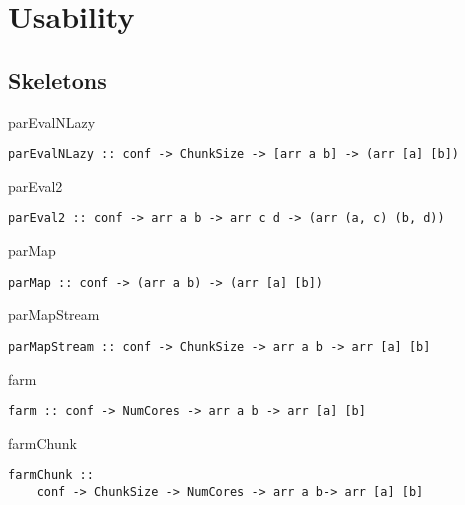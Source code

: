\section{Usability}
\subsection{Skeletons}
\begin{frame}[fragile]{parEvalNLazy}
\begin{lstlisting}[frame=htrbl]
parEvalNLazy :: conf -> ChunkSize -> [arr a b] -> (arr [a] [b])
\end{lstlisting}
\end{frame}

\begin{frame}[fragile]{parEval2}
\begin{lstlisting}[frame=htrbl]
parEval2 :: conf -> arr a b -> arr c d -> (arr (a, c) (b, d))
\end{lstlisting}
\end{frame}

\begin{frame}[fragile]{parMap}
\begin{lstlisting}[frame=htrbl]
parMap :: conf -> (arr a b) -> (arr [a] [b])
\end{lstlisting}
\end{frame}

\begin{frame}[fragile]{parMapStream}
\begin{lstlisting}[frame=htrbl]
parMapStream :: conf -> ChunkSize -> arr a b -> arr [a] [b]
\end{lstlisting}
\end{frame}

\begin{frame}[fragile]{farm}
\begin{lstlisting}[frame=htrbl]
farm :: conf -> NumCores -> arr a b -> arr [a] [b]
\end{lstlisting}
\end{frame}

\begin{frame}[fragile]{farmChunk}
\begin{lstlisting}[frame=htrbl]
farmChunk ::
	conf -> ChunkSize -> NumCores -> arr a b-> arr [a] [b]
\end{lstlisting}
\end{frame}